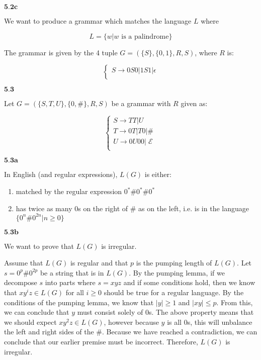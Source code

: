 \documentclass{article}
\DeclareMathOperator{\E}{\mathcal{E}}
\newcommand{\problem}[1]{$\boxed{\textbf{#1}}$}
\begin{document}
\begin{minipage}{\textwidth}
\problem{5.2c}

We want to produce a grammar which matches the language $L$ where

\[
L=\{w|\text{$w$ is a palindrome}\}
\]

The grammar is given by the 4 tuple $G=(\{S\},\{0,1\},R,S)$, where
$R$ is:

\[\begin{cases}
S\rightarrow 0S0|1S1|\epsilon \\
\end{cases}\]

\end{minipage}


\problem{5.3}

Let $G=(\{S,T,U\},\{0,\#\},R,S)$ be a grammar with $R$ given as:

\[\begin{cases}
S\rightarrow TT|U \\
T\rightarrow 0T|T0|\# \\
U\rightarrow 0U00|\E \\
\end{cases}\]

\begin{minipage}{\textwidth}
\problem{5.3a}

In English (and regular expressions), $L(G)$ is either:

\begin{enumerate}[label=(\alph*)]
\item matched by the regular expression $0^*\#0^*\#0^*$
\item has twice as many $0$s on the right of $\#$ as on the left,
  i.e. is in the language $\{0^n\#0^{2n}|n\ge0\}$
\end{enumerate}

\end{minipage}

\begin{minipage}{\textwidth}
\problem{5.3b}

We want to prove that $L(G)$ is irregular.

Assume that $L(G)$ is regular and that $p$ is the pumping length of
$L(G)$. Let $s=0^p\#0^{2p}$ be a string that is in $L(G)$. By the
pumping lemma, if we decompose $s$ into parts where $s=xyz$ and if
some conditions hold, then we know that $xy^iz\in{}L(G)$ for all
$i\ge0$ should be true for a regular language. By the conditions of
the pumping lemma, we know that $|y|\ge1$ and $|xy|\le{}p$. From this,
we can conclude that $y$ must consist solely of $0$s. The above
property means that we should expect $xy^2z\in{}L(G)$, however because
$y$ is all $0$s, this will unbalance the left and right sides of the
$\#$. Because we have reached a contradiction, we can conclude that
our earlier premise must be incorrect. Therefore, $L(G)$ is irregular.

\end{minipage}
\end{document}
